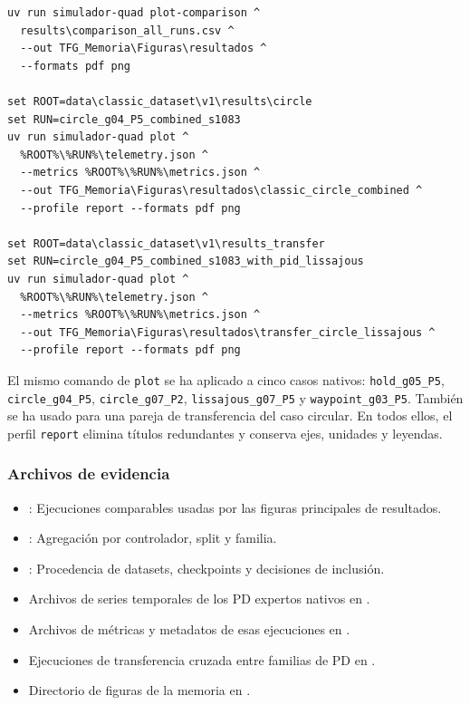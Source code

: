 \begin{verbatim}
uv run simulador-quad plot-comparison ^
  results\comparison_all_runs.csv ^
  --out TFG_Memoria\Figuras\resultados ^
  --formats pdf png

set ROOT=data\classic_dataset\v1\results\circle
set RUN=circle_g04_P5_combined_s1083
uv run simulador-quad plot ^
  %ROOT%\%RUN%\telemetry.json ^
  --metrics %ROOT%\%RUN%\metrics.json ^
  --out TFG_Memoria\Figuras\resultados\classic_circle_combined ^
  --profile report --formats pdf png

set ROOT=data\classic_dataset\v1\results_transfer
set RUN=circle_g04_P5_combined_s1083_with_pid_lissajous
uv run simulador-quad plot ^
  %ROOT%\%RUN%\telemetry.json ^
  --metrics %ROOT%\%RUN%\metrics.json ^
  --out TFG_Memoria\Figuras\resultados\transfer_circle_lissajous ^
  --profile report --formats pdf png
\end{verbatim}

El mismo comando de \texttt{plot} se ha aplicado a cinco casos nativos:
\texttt{hold\_g05\_P5}, \texttt{circle\_g04\_P5}, \texttt{circle\_g07\_P2},
\texttt{lissajous\_g07\_P5} y \texttt{waypoint\_g03\_P5}. También se ha usado
para una pareja de transferencia del caso circular. En todos ellos, el perfil
\texttt{report} elimina títulos redundantes y conserva ejes, unidades y leyendas.

\subsubsection*{Archivos de evidencia}

\begin{itemize}
  \item {}: Ejecuciones comparables usadas
    por las figuras principales de resultados.
  \item {}: Agregación por controlador,
    split y familia.
  \item {}: Procedencia de datasets,
    checkpoints y decisiones de inclusión.
  \item Archivos de series temporales de los PD expertos nativos en
    .
  \item Archivos de métricas y metadatos de esas ejecuciones en
    .
  \item Ejecuciones de transferencia cruzada entre familias de PD en
    .
  \item Directorio de figuras de la memoria en
    .
\end{itemize}
